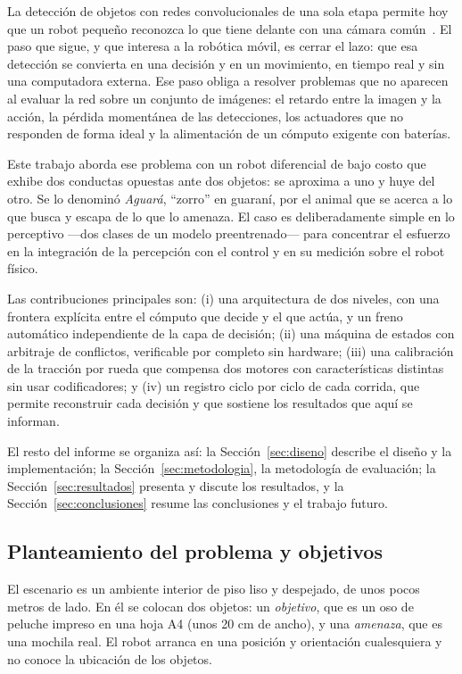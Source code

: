\documentclass[pdflatex,sn-mathphys-num]{sn-jnl}
\begin{document}
La detecci\'on de objetos con redes convolucionales de una sola etapa permite
hoy que un robot peque\~no reconozca lo que tiene delante con una c\'amara
com\'un~\cite{ref:yolo,ref:yolorev}. El paso que sigue, y que interesa a la
rob\'otica m\'ovil, es cerrar el lazo: que esa detecci\'on se convierta en una
decisi\'on y en un movimiento, en tiempo real y sin una computadora externa.
Ese paso obliga a resolver problemas que no aparecen al evaluar la red sobre
un conjunto de im\'agenes: el retardo entre la imagen y la acci\'on, la
p\'erdida moment\'anea de las detecciones, los actuadores que no responden de
forma ideal y la alimentaci\'on de un c\'omputo exigente con bater\'ias.

Este trabajo aborda ese problema con un robot diferencial de bajo costo que
exhibe dos conductas opuestas ante dos objetos: se aproxima a uno y huye del
otro. Se lo denomin\'o \emph{Aguar\'a}, ``zorro'' en guaran\'i, por el animal
que se acerca a lo que busca y escapa de lo que lo amenaza. El caso es deliberadamente simple en lo perceptivo ---dos clases de un
modelo preentrenado--- para concentrar el esfuerzo en la integraci\'on de la
percepci\'on con el control y en su medici\'on sobre el robot f\'isico.

Las contribuciones principales son: (i) una arquitectura de dos niveles, con
una frontera expl\'icita entre el c\'omputo que decide y el que act\'ua, y un
freno autom\'atico independiente de la capa de decisi\'on; (ii) una m\'aquina
de estados con arbitraje de conflictos, verificable por completo sin hardware;
(iii) una calibraci\'on de la tracci\'on por rueda que compensa dos motores
con caracter\'isticas distintas sin usar codificadores; y (iv) un registro
ciclo por ciclo de cada corrida, que permite reconstruir cada decisi\'on y que
sostiene los resultados que aqu\'i se informan.

El resto del informe se organiza as\'i: la Secci\'on~\ref{sec:diseno} describe
el dise\~no y la implementaci\'on; la Secci\'on~\ref{sec:metodologia}, la
metodolog\'ia de evaluaci\'on; la Secci\'on~\ref{sec:resultados} presenta y
discute los resultados, y la Secci\'on~\ref{sec:conclusiones} resume las
conclusiones y el trabajo futuro.

\subsection{Planteamiento del problema y objetivos}\label{subsec:problema}

El escenario es un ambiente interior de piso liso y despejado, de unos pocos
metros de lado. En \'el se colocan dos objetos: un \emph{objetivo}, que es un
oso de peluche impreso en una hoja A4 (unos 20 cm de ancho), y una
\emph{amenaza}, que es una mochila real. El robot arranca en una posici\'on y
orientaci\'on cualesquiera y no conoce la ubicaci\'on de los objetos.
\end{document}
